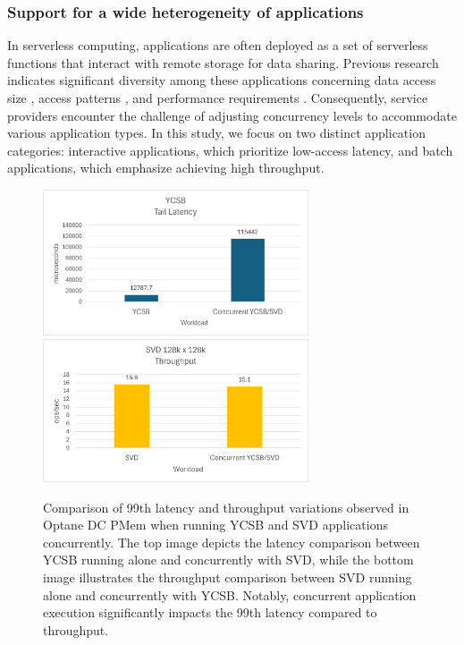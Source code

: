 \subsubsection{Support for a wide heterogeneity of applications}

In serverless computing, applications are often deployed as a set of serverless functions that interact with remote storage for data sharing. Previous research indicates significant diversity among these applications concerning data access size \cite{klimovic2018pocket,romero2021faat}, access patterns \cite{romero2021faat}, and performance requirements \cite{180275,jonas2019cloud}. Consequently, service providers encounter the challenge of adjusting concurrency levels to accommodate various application types. In this study, we focus on two distinct application categories: interactive applications, which prioritize low-access latency, and batch applications, which emphasize achieving high throughput.


\begin{figure}[ht]
  \centering
  \includegraphics[width=0.7\textwidth,height=\textheight,keepaspectratio,angle=0]{images/measurement-study-latency.png}
  \includegraphics[width=0.7\textwidth,height=\textheight,keepaspectratio,angle=0]{images/measurement-study-tp.png}
  \caption[Impact of Concurrent Applications on Optane PMem 99th Latency and Throughput]{Comparison of 99th latency and throughput variations observed in Optane DC PMem when running YCSB and SVD applications concurrently. The top image depicts the latency comparison between YCSB running alone and concurrently with SVD, while the bottom image illustrates the throughput comparison between SVD running alone and concurrently with YCSB. Notably, concurrent application execution significantly impacts the 99th latency compared to throughput.}
  \label{fig:measurement_study}
\end{figure}

